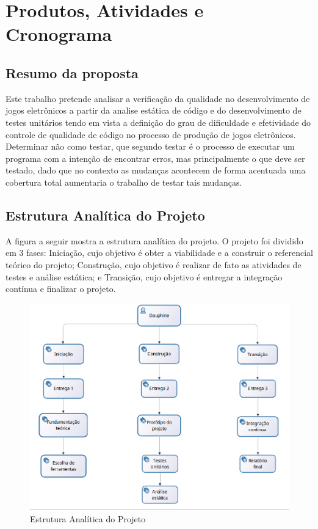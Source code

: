 \chapter[Produtos, Atividades e Cronograma]{Produtos, Atividades e Cronograma}

\section{Resumo da proposta}

Este trabalho pretende analisar a verificação da qualidade no desenvolvimento de jogos eletrônicos a partir da analise estática de código e do desenvolvimento de testes unitários tendo em vista a definição do grau de dificuldade e efetividade do controle de qualidade de código no processo de produção de jogos eletrônicos.
Determinar não como testar, que segundo  testar é o processo de executar um programa com a intenção de encontrar erros, mas principalmente o que deve ser testado, dado que no contexto as mudanças acontecem de forma acentuada uma cobertura total aumentaria o trabalho de testar tais mudanças.

\section{Estrutura Analítica do Projeto}

A figura a seguir mostra a estrutura analítica do projeto. O projeto foi dividido em 3 fases: Iniciação, cujo objetivo é obter a viabilidade e a construir o referencial teórico do projeto; Construção, cujo objetivo é realizar de fato as atividades de testes e análise estática; e Transição, cujo objetivo é entregar a integração contínua e finalizar o projeto.
\begin{figure}[h]
 \centering
 \includegraphics[scale=0.4]{figuras/eap.eps}
 \caption{Estrutura Analítica do Projeto}
\end{figure}

